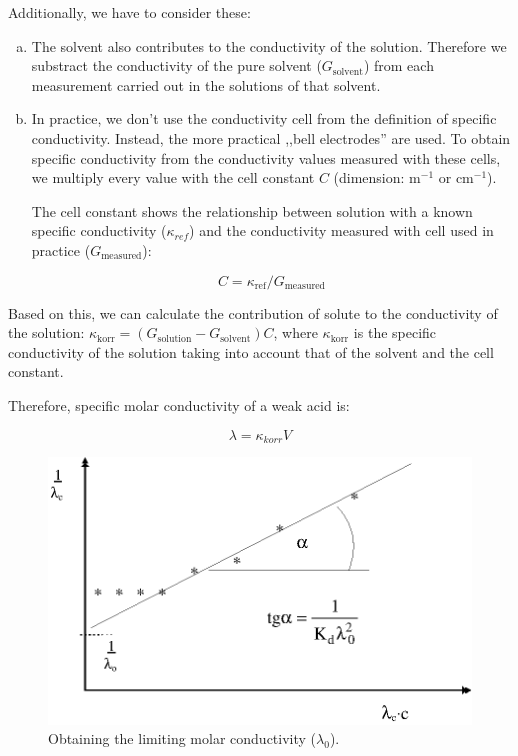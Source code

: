 Additionally, we have to consider these:

\begin{enumerate}[(a)]
\item The solvent also contributes to the conductivity of the solution. Therefore we substract the conductivity of the pure solvent ($G_{\text{solvent}}$) from each measurement carried out in the solutions of that solvent.

\item In practice, we don't use the conductivity cell from the definition of specific conductivity. Instead, the more practical ,,bell electrodes'' are used. To obtain specific conductivity from the conductivity values measured with these cells, we multiply every value with the cell constant $C$ (dimension:  m$^{-1}$ or cm$^{-1}$).

The cell constant shows the relationship between solution with a known specific conductivity ($\kappa_{ref}$) and the conductivity measured with cell used in practice ($G_{\text{measured}}$):

\begin{equation}
\label{eq:c}
	C
	=
	\kappa_{\text{ref}}/G_{\text{measured}}
\end{equation}

\end{enumerate}

Based on this, we can calculate the contribution of solute to the conductivity of the solution: $\kappa_{\text{korr}} = (G_{\text{solution}} - G_{\text{solvent}})C$, where $\kappa_{\text{korr}}$ is the specific conductivity of the solution taking into account that of the solvent and the cell constant.

Therefore, specific molar conductivity of a weak acid is:

\begin{equation}
\label{eq:c}
        \lambda
        =
        \kappa_{korr}
	V
\end{equation}


\begin{figure}[h!]
\centering
\includegraphics{fig/lambda0.eps}
\caption{Obtaining the limiting molar conductivity ($\lambda_0$).}
\label{fig:}
\end{figure}

